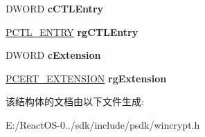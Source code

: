 \begin{DoxyCompactItemize}
\item 
\mbox{\label{struct___c_t_l___i_n_f_o_ac0f1cc9f3e617a4f47309f7044332148}} 
D\+W\+O\+RD {\bfseries c\+C\+T\+L\+Entry}
\item 
\mbox{\label{struct___c_t_l___i_n_f_o_a9743e89bcb2b6c5c43b2b86e04a79cd2}} 
\hyperlink{struct___c_t_l___e_n_t_r_y}{P\+C\+T\+L\+\_\+\+E\+N\+T\+RY} {\bfseries rg\+C\+T\+L\+Entry}
\item 
\mbox{\label{struct___c_t_l___i_n_f_o_a22de9a7608933fbe7f1ea20e7806cfc6}} 
D\+W\+O\+RD {\bfseries c\+Extension}
\item 
\mbox{\label{struct___c_t_l___i_n_f_o_ae1d37ee9896a5ae01c5c9ced408a7937}} 
\hyperlink{struct___c_e_r_t___e_x_t_e_n_s_i_o_n}{P\+C\+E\+R\+T\+\_\+\+E\+X\+T\+E\+N\+S\+I\+ON} {\bfseries rg\+Extension}
\end{DoxyCompactItemize}


该结构体的文档由以下文件生成\+:\begin{DoxyCompactItemize}
\item 
E\+:/\+React\+O\+S-\/0../sdk/include/psdk/wincrypt.\+h\end{DoxyCompactItemize}
